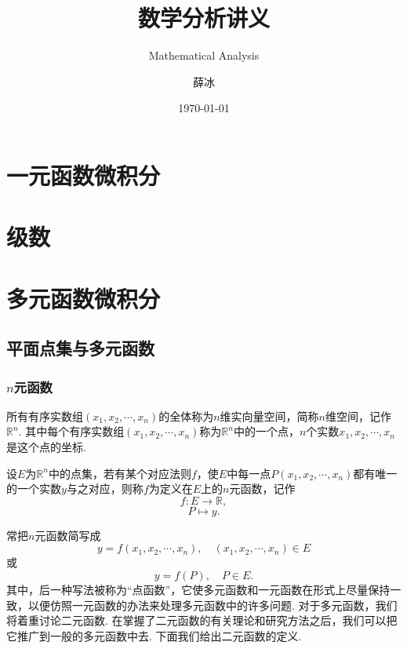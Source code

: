 \documentclass[lang=cn,10pt]{elegantbook}
\title{数学分析讲义}
\subtitle{Mathematical Analysis}
\author{薛冰}
\date{\today}
\begin{document}
	\maketitle
	

\newpage
	
\tableofcontents
\mainmatter
	

\newpage

\part{一元函数微积分}


\newpage


\newpage


\newpage


\newpage


\newpage


\newpage


\newpage


\newpage


\newpage

\part{级数}


\newpage


\newpage

\part{多元函数微积分}

\chapter{平面点集与多元函数}
\section{$n$元函数}
所有有序实数组$(x_1,x_2,\cdots,x_n)$的全体称为$n${\heiti 维实向量空间}，简称{\heiti $n$维空间}，记作$\mathbb{R}^n$. 其中每个有序实数组$(x_1,x_2,\cdots,x_n)$称为$\mathbb{R}^n$中的一个点，$n$个实数$x_1,x_2,\cdots,x_n$是这个点的坐标.
\begin{definition}[$n$元函数]
	设$E$为$\mathbb{R}^n$中的点集，若有某个对应法则$f$，使$E$中每一点$P(x_1,x_2,\cdots,x_n)$都有唯一的一个实数$y$与之对应，则称$f$为定义在$E$上的$n$元函数，记作
	$$f:E\to\mathbb{R},$$
	$$P\mapsto y.$$
\end{definition}
常把$n$元函数简写成
$$y=f(x_1,x_2,\cdots,x_n),\quad (x_1,x_2,\cdots,x_n)\in E$$
或
$$y=f(P),\quad P\in E.$$
其中，后一种写法被称为“点函数”，它使多元函数和一元函数在形式上尽量保持一致，以便仿照一元函数的办法来处理多元函数中的许多问题. 对于多元函数，我们将着重讨论二元函数. 在掌握了二元函数的有关理论和研究方法之后，我们可以把它推广到一般的多元函数中去. 下面我们给出二元函数的定义.
\end{document}

